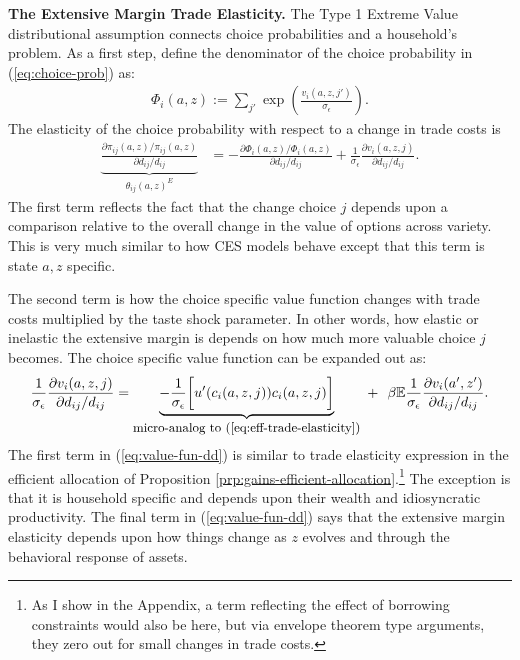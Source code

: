 \documentclass[12pt,pdftex]{article}
\begin{document}
\begin{onehalfspacing}
\textbf{The Extensive Margin Trade Elasticity.} The Type 1 Extreme Value distributional assumption connects choice probabilities and a household's problem. As a first step, define the denominator of the choice probability in (\ref{eq:choice-prob}) as:
\begin{align}
\Phi_{i}(a,z) := \sum_{j'} \exp \left( \frac{ v_{i}(a, z, j') }{\sigma_{\epsilon}} \right).
\end{align}
The elasticity of the choice probability with respect to a change in trade costs is
\begin{align}
\underbrace{ \frac{\partial \pi_{ij}(a,z) / \pi_{ij}(a,z)}{\partial d_{ij} / d_{ij}} }_{\theta_{ij}(a,z)^{E}} &= - \frac{\partial \Phi_{i}(a,z) / \Phi_{i}(a,z)}{\partial d_{ij}/d_{ij}} + \frac{1}{\sigma_{\epsilon}}\frac{\partial v_{i}(a,z,j)}{\partial d_{ij}/d_{ij}} .
\label{eq:extensive-margin}
\end{align}
The first term reflects the fact that the change choice $j$ depends upon a comparison relative to the overall change in the value of options across variety. This is very much similar to how CES models behave except that this term is state $a,z$ specific.

The second term is how the choice specific value function changes with trade costs multiplied by the taste shock parameter. In other words, how elastic or inelastic the extensive margin is depends on how much more valuable choice $j$ becomes. The choice specific value function can be expanded out as:
\begin{align}
\frac{1}{\sigma_{\epsilon}}\frac{\partial v_{i}(a,z,j)}{\partial d_{ij}/d_{ij}} = \underbrace{-\frac{1}{\sigma_{\epsilon}}\bigg[u'(c_{i}(a,z,j))c_{i}(a,z,j)\bigg]}_{\mbox{\small micro-analog to (\ref{eq:eff-trade-elasticity})}} \
+ \ \ \beta \mathbb{E}\frac{1}{\sigma_{\epsilon}}\frac{\partial v_{i}(a',z')}{\partial d_{ij}/ d_{ij}}. \label{eq:value-fun-dd}
\end{align}
The first term in (\ref{eq:value-fun-dd}) is similar to trade elasticity expression in the efficient allocation of Proposition \ref{prp:gains-efficient-allocation}.\footnote{\label{f-note:bc-elasticity}As I show in the Appendix, a term reflecting the effect of borrowing constraints would also be here, but via envelope theorem type arguments, they zero out for small changes in trade costs.} The exception is that it is household specific and depends upon their wealth and idiosyncratic productivity. The final term in (\ref{eq:value-fun-dd}) says that the extensive margin elasticity depends upon how things change as $z$ evolves and through the behavioral response of assets.


\end{onehalfspacing}
\end{document}
